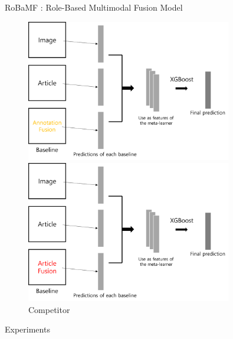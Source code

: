 \documentclass[final]{beamer}
\newlength{\colwidth}
\begin{document}
\begin{frame}[t]
\begin{columns}[t]
\begin{column}{\colwidth}
\begin{alertblock}{RoBaMF : Role-Based Multimodal Fusion Model}
    \begin{figure}[ht]
        \centering
        \begin{minipage}[b]{0.45\textwidth}
            \centering
            \includegraphics[width=0.8\textwidth]{Figure/fig-model.png} %
            \caption{RoBaMF}
            \label{fig:model}
        \end{minipage}
        \hfill %
        \begin{minipage}[b]{0.45\textwidth}
            \centering
            \includegraphics[width=0.8\textwidth]{Figure/fig-competitor.png} %
            \caption{Competitor}
            \label{fig:competitor}
        \end{minipage}
    \end{figure}
        \end{alertblock}



  \begin{block}{Experiments}


\end{block}
\end{column}
\end{columns}
\end{frame}
\end{document}
